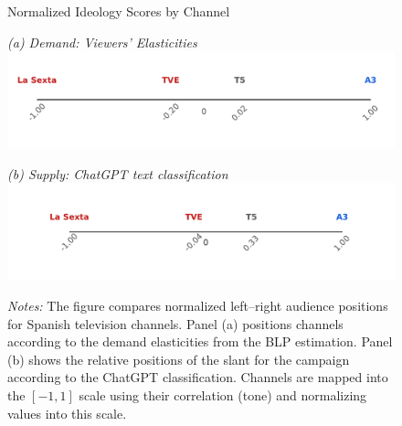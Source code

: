 \documentclass[12pt]{article}
\begin{document}
	\begin{figure}[ht]
		\centering
		\caption{Normalized Ideology Scores by Channel}
		\begin{minipage}[t]{0.48\textwidth}
			\centering
			\textit{(a) Demand: Viewers' Elasticities}
			\includegraphics[width=\linewidth]{figures/congress_line_audience_share}
		\end{minipage}
		\hfill
		\begin{minipage}[t]{0.48\textwidth}
			\centering
			
			
			\textit{(b) Supply: ChatGPT text classification}
			\includegraphics[width=\linewidth]{figures/congress_line_chatgpt_campaign}
			
			
		\end{minipage}
		
		
		\caption*{\small \textit{Notes:} The figure compares normalized left–right audience positions for Spanish television channels. Panel (a) positions channels according to the demand elasticities from the BLP estimation. Panel (b) shows the relative  positions of the slant for the campaign according to the ChatGPT classification. 			Channels are mapped into the $[-1,1]$ scale using their correlation (tone) and normalizing values into this scale. }
		\label{fig:channel_ideology_lines2}
	\end{figure}
	
	
	
\end{document}
